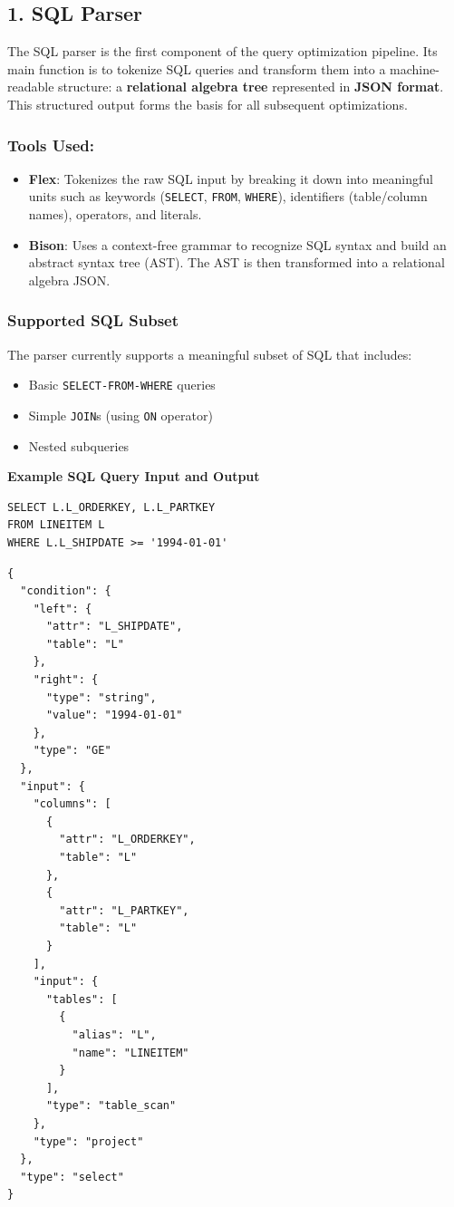 \documentclass[12pt]{article}
\begin{document}
\subsection*{1. SQL Parser}

The SQL parser is the first component of the query optimization pipeline. Its main function is to tokenize SQL queries and transform them into a machine-readable structure: a \textbf{relational algebra tree} represented in \textbf{JSON format}. This structured output forms the basis for all subsequent optimizations.

\subsubsection*{Tools Used:}

\begin{itemize}
    \item \textbf{Flex}: Tokenizes the raw SQL input by breaking it down into meaningful units such as keywords (\texttt{SELECT}, \texttt{FROM}, \texttt{WHERE}), identifiers (table/column names), operators, and literals.
    \item \textbf{Bison}: Uses a context-free grammar to recognize SQL syntax and build an abstract syntax tree (AST). The AST is then transformed into a relational algebra JSON.
\end{itemize}

\subsubsection*{Supported SQL Subset}

The parser currently supports a meaningful subset of SQL that includes:
\begin{itemize}
    \item Basic \texttt{SELECT-FROM-WHERE} queries
    \item Simple \texttt{JOIN}s (using \texttt{ON} operator)
    \item Nested subqueries
\end{itemize}


\captionsetup{type=table}
\noindent\textbf{Example SQL Query Input and Output}
\begin{verbatim}
SELECT L.L_ORDERKEY, L.L_PARTKEY
FROM LINEITEM L
WHERE L.L_SHIPDATE >= '1994-01-01'
\end{verbatim}

\begin{table}[H]
\captionsetup{type=table}
\begin{verbatim}
{
  "condition": {
    "left": {
      "attr": "L_SHIPDATE",
      "table": "L"
    },
    "right": {
      "type": "string",
      "value": "1994-01-01"
    },
    "type": "GE"
  },
  "input": {
    "columns": [
      {
        "attr": "L_ORDERKEY",
        "table": "L"
      },
      {
        "attr": "L_PARTKEY",
        "table": "L"
      }
    ],
    "input": {
      "tables": [
        {
          "alias": "L",
          "name": "LINEITEM"
        }
      ],
      "type": "table_scan"
    },
    "type": "project"
  },
  "type": "select"
}
\end{verbatim}
\end{table}
\end{document}
